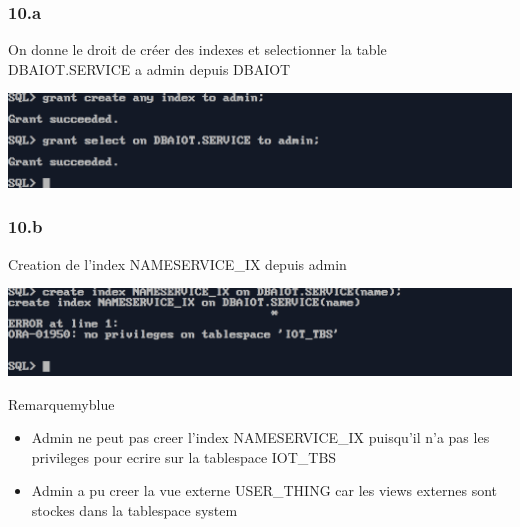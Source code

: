 \subsubsection*{10.a}
On donne le droit de créer des indexes et selectionner la table DBAIOT.SERVICE a admin depuis DBAIOT



\begin{center}
    \includegraphics[width=\textwidth]{ScreenShot/Partie4/grant3.png}
\end{center}

\subsubsection*{10.b}
Creation de l'index NAMESERVICE\_IX depuis admin



\begin{center}
    \includegraphics[width=\textwidth]{ScreenShot/Partie4/index1.png}
\end{center}

\begin{prettyBox}{Remarque}{myblue}
\begin{itemize}
\item Admin ne peut pas creer l'index NAMESERVICE\_IX puisqu'il n'a pas les privileges pour ecrire sur la tablespace IOT\_TBS 
\item Admin a pu creer la vue externe USER\_THING car les views externes sont stockes dans la tablespace system
\end{itemize}
\end{prettyBox}

